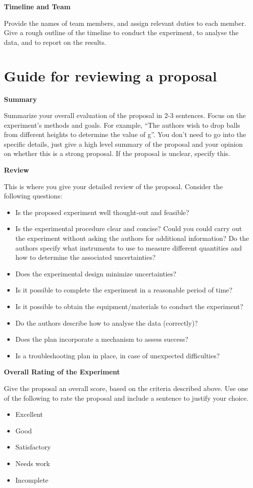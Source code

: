 \textbf{Timeline and Team}

Provide the names of team members, and assign relevant duties to each member. Give a rough outline of the timeline to conduct the experiment, to analyse the data, and to report on the results.

\newpage
\section{Guide for reviewing a proposal}
 \vspace{0.25cm}
\textbf{Summary}

Summarize your overall evaluation of the proposal in 2-3 sentences. Focus on the experiment's methods and goals. For example, ``The authors wish to drop balls from different heights to determine the value of g''. You don't need to go into the specific details, just give a high level summary of the proposal and your opinion on whether this is a strong proposal. If the proposal is unclear, specify this.

\textbf{Review}

This is where you give your detailed review of the proposal. Consider the following questions:
\begin{itemize}
\item Is the proposed experiment well thought-out and feasible?
\item Is the experimental procedure clear and concise? Could you could carry out the experiment without asking the authors for additional information? Do the authors specify what instruments to use to measure different quantities and how to determine the associated uncertainties?
\item Does the experimental design minimize uncertainties?
\item Is it possible to complete the experiment in a reasonable period of time?
\item Is it possible to obtain the equipment/materials to conduct the experiment?
\item Do the authors describe how to analyse the data (correctly)?
\item Does the plan incorporate a mechanism to assess success?
\item Is a troubleshooting plan in place, in case of unexpected difficulties?
\end{itemize}

\textbf{Overall Rating of the Experiment}

Give the proposal an overall score, based on the criteria described above. Use one of the following to rate the proposal and include a sentence to justify your choice.
\begin{itemize}
\item Excellent
\item Good
\item Satisfactory
\item Needs work
\item Incomplete
\end{itemize}

